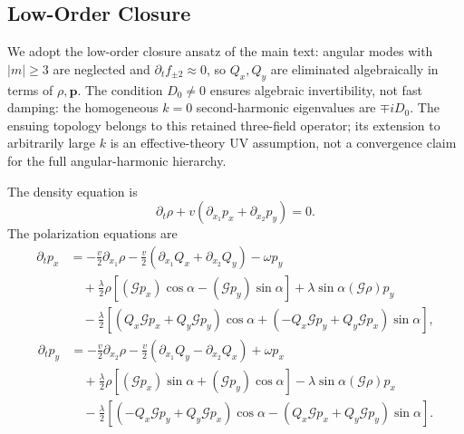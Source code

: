 \documentclass[11pt]{article}
\numberwithin{equation}{section}
\begin{document}
\subsection{Low-Order Closure}

We adopt the low-order closure ansatz of the main text: angular modes with
$|m|\ge3$ are neglected and $\partial_t f_{\pm2}\approx0$, so $Q_x,Q_y$
are eliminated algebraically in terms of $\rho,\mathbf p$.
The condition $D_0\ne0$ ensures algebraic invertibility, not fast damping:
the homogeneous $k=0$ second-harmonic eigenvalues are $\mp iD_0$.
The ensuing topology belongs to this retained three-field operator; its
extension to arbitrarily large $k$ is an effective-theory UV assumption,
not a convergence claim for the full angular-harmonic hierarchy.

The density equation is
\begin{equation}
  \partial_t\rho+v(\partial_{x_1}p_x+\partial_{x_2}p_y)=0.
  \label{eq:density_equation}
\end{equation}
The polarization equations are
\begin{align}
  \partial_t p_x
  &=
  -\frac{v}{2}\partial_{x_1}\rho
  -\frac{v}{2}(\partial_{x_1}Q_x+\partial_{x_2}Q_y)
  -\omega p_y \nonumber\\
  &\quad
  +\frac{\lambda}{2}\rho[
  (\mathcal Gp_x)\cos\alpha-(\mathcal Gp_y)\sin\alpha]
  +\lambda\sin\alpha(\mathcal G\rho)p_y \nonumber\\
  &\quad
  -\frac{\lambda}{2}
  \left[
  (Q_x\mathcal Gp_x+Q_y\mathcal Gp_y)\cos\alpha
  +(-Q_x\mathcal Gp_y+Q_y\mathcal Gp_x)\sin\alpha
  \right],
  \label{eq:px_equation}
\end{align}
\begin{align}
  \partial_t p_y
  &=
  -\frac{v}{2}\partial_{x_2}\rho
  -\frac{v}{2}(\partial_{x_1}Q_y-\partial_{x_2}Q_x)
  +\omega p_x \nonumber\\
  &\quad
  +\frac{\lambda}{2}\rho[
  (\mathcal Gp_x)\sin\alpha+(\mathcal Gp_y)\cos\alpha]
  -\lambda\sin\alpha(\mathcal G\rho)p_x \nonumber\\
  &\quad
  -\frac{\lambda}{2}
  \left[
  (-Q_x\mathcal Gp_y+Q_y\mathcal Gp_x)\cos\alpha
  -(Q_x\mathcal Gp_x+Q_y\mathcal Gp_y)\sin\alpha
  \right].
  \label{eq:py_equation}
\end{align}
\end{document}
